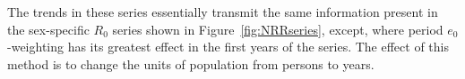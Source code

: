 The trends in these series essentially transmit the same information
present in the sex-specific $R_0$ series shown in Figure~\ref{fig:NRRseries},
except, where period $e_0$-weighting has its greatest effect in the first years
of the series. The effect of this method is to change the units of population
from persons to years. 